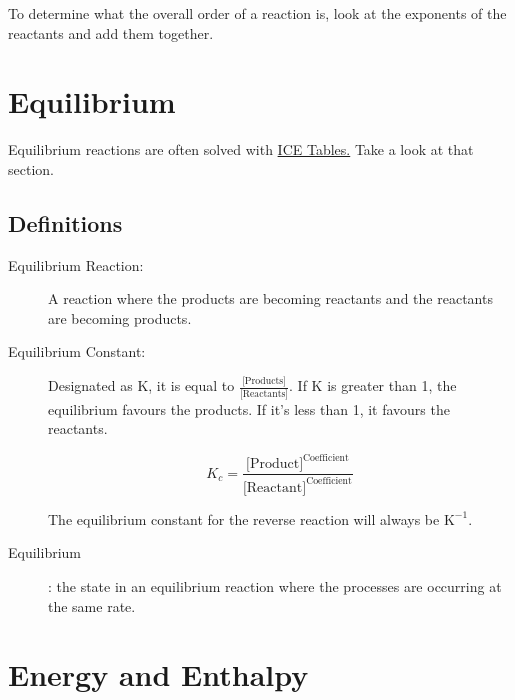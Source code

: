 \documentclass[]{article}
\begin{document}
To determine what the overall order of a reaction is, look at the exponents of the reactants and add them together.

\section{Equilibrium}
Equilibrium reactions are often solved with \hyperref[sec:ICE]{ICE Tables.} 
Take a look at that section.
\subsection{Definitions}
\begin{description}
\item[Equilibrium Reaction:] A reaction where the products are becoming reactants and the reactants are becoming products. 
\item[Equilibrium Constant:] Designated as K, it is equal to $ \frac{\text{[Products]}}{\text{[Reactants]}} $. If K is greater than 1, the equilibrium favours the products. If it's less than 1, it favours the reactants. 

\[
	K_c = \frac{\text{[Product]}^{\text{Coefficient}}}{\text{[Reactant]}^\text{Coefficient}}
\]

The equilibrium constant for the reverse reaction will always be $ \text{K}^{-1} $.
\item[Equilibrium]: the state in an equilibrium reaction where the processes are occurring at the same rate.
\end{description}
\section{Energy and Enthalpy}
\end{document}
